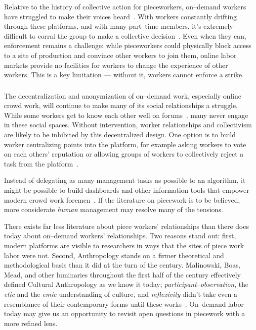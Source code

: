 \documentclass[trackingWork]{subfiles}
\begin{document}
Relative to the history of collective action for pieceworkers,
on--demand workers have struggled to make their voices heard~\cite{dynamo,storiesIraniSilberman,turkopticon}.
With workers constantly drifting through these platforms, and with many part--time members,
it's extremely difficult to corral the group to make a collective decision~\cite{dynamo}.
Even when they can, enforcement remains a challenge:
while pieceworkers could physically block access to a site of production and convince other workers to join them,
online labor markets provide no facilities for workers to change the experience of other workers.
This is a key limitation --- without it, workers cannot enforce a strike.


\subsubsection{\implication}
The decentralization and anonymization of on--demand work, especially online crowd work, will continue to make many of its social relationships a struggle.
While some workers get to know each other well on forums~\cite{martin2014being,crowdcollab}, many never engage in these social spaces.
Without intervention, worker relationships and collectivism are likely to be inhibited by this decentralized design.
One option is to build worker centralizing points into the platform, for example asking workers to vote on each others' reputation or allowing groups of workers to collectively reject a task from the platform~\cite{crowdguilds}.

Instead of delegating as many management tasks as possible to an algorithm,
it might be possible to build dashboards and
other information tools that empower modern crowd work foremen~\cite{kulkarni2012mobileworks}.
If the literature on piecework is to be believed,
more considerate \textit{human} management may resolve
many of the tensions.

There exists far less literature about piece workers' relationships than there does today about on--demand workers' relationships.
Two reasons stand out: first, modern platforms are visible to researchers in ways that the sites of piece work labor were not.
Second, Anthropology stands on a firmer theoretical and methodological basis than it did at the turn of the  century.
Malinowski, Boas, Mead, and
other luminaries throughout the first half of the  century
effectively defined Cultural Anthropology as we know it today;
\textit{participant--observation},
the \textit{etic} and the \textit{emic} understanding of culture, and
\textit{reflexivity}
didn't take even a resemblance of their contemporary forms until these works~\cite{malinowski2002argonauts,boas1940race,mead1973coming}.
On--demand labor today may give us an opportunity to revisit open questions in piecework with a more refined lens.





\end{document}
